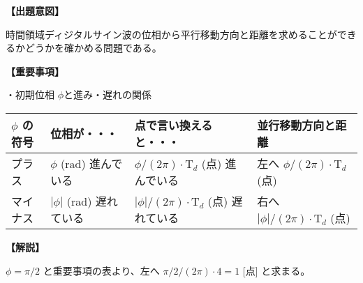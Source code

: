 \noindent \textbf{【出題意図】}

\bigskip
\noindent 時間領域ディジタルサイン波の位相から平行移動方向と距離を求めることができるかどうかを確かめる問題である。

\vspace{1em}
\noindent \textbf{【重要事項】}

\noindent ・初期位相 $\phi$と進み・遅れの関係

\medskip
\begin{center}
\small
\begin{tabularx}{0.9\fbwidth}{|X|X|X|X|}
\hline
$\phi$ の符号&  位相が・・・   & 点で言い換えると・・・   & 並行移動方向と距離 \\
\hline
プラス &  $\phi$ (rad) 進んでいる & $\phi/(2\pi) \cdot \textrm{T}_d$ (点) 進んでいる & 左へ $\phi/(2\pi) \cdot \textrm{T}_d$ (点) \\
\hline
マイナス &  $|\phi|$ (rad) 遅れている & $|\phi|/(2\pi) \cdot \textrm{T}_d$ (点) 遅れている & 右へ $|\phi|/(2\pi) \cdot \textrm{T}_d$ (点) \\
\hline
\end{tabularx}
\end{center}

\bigskip

\vspace{1em}
\noindent \textbf{【解説】}

\bigskip
\noindent $\phi = \pi/2$ と重要事項の表より、左へ $\pi/2/(2\pi) \cdot 4 = 1$ [点] と求まる。
